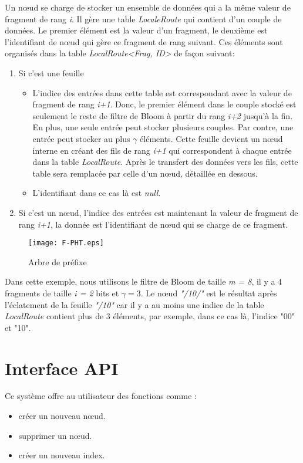 \documentclass[a4paper,11pt]{report}
\begin{document}
	Un nœud se charge de stocker un ensemble de données qui a la même valeur de fragment de rang \textit{i}. Il gère une table \textit{LocaleRoute} qui contient d'un couple de données. Le premier élément est la valeur d'un fragment, le deuxième est l'identifiant de nœud qui gère ce fragment de rang suivant. Ces éléments sont organisés dans la table \textit{LocalRoute<Frag, ID>} de façon suivant:
	\begin{enumerate}
		\item Si c'est une feuille
			\begin{itemize}
				\item L'indice des entrées dans cette table est correspondant avec la valeur de fragment de rang \textit{i+1}. Donc, le premier élément dans le couple stocké est seulement le reste de filtre de Bloom à partir du rang \textit{i+2} jusqu'à la fin. En plus, une seule entrée peut stocker plusieurs couples. Par contre, une entrée peut stocker au plus $\gamma$ éléments. Cette feuille devient un nœud interne en créant des fils de rang \textit{i+1} qui correspondent à chaque entrée dans la table \textit{LocalRoute}. Après le transfert des données vers les fils, cette table sera remplacée par celle d'un nœud, détaillée en dessous.
				\item L'identifiant dans ce cas là est \textit{null}.
			\end{itemize}
		\item Si c'est un nœud, l'indice des entrées est maintenant la valeur de fragment de rang \textit{i+1}, la donnée est l'identifiant de nœud qui se charge de ce fragment.
	\end{enumerate}	
		
	\begin{figure}[!htbp]
	\centering
	\texttt{[image: F-PHT.eps]}
	\caption{Arbre de préfixe}
	\label{F-PHT}
	\end{figure}	

\newpage	

	Dans cette exemple, nous utilisons le filtre de Bloom de taille \textit{m = 8}, il y a 4 fragments de taille \textit{i = 2} bits et $\gamma = 3$. Le nœud \textit{"/10/"} est le résultat après l'éclatement de la feuille \textit{"/10"} car il y a au moins une indice de la table \textit{LocalRoute} contient plus de 3 éléments, par exemple, dans ce cas là, l'indice "00" et "10".

\section{Interface API}
	Ce système offre au utilisateur des fonctions comme :
	\begin{itemize}
		\item créer un nouveau nœud.
		\item supprimer un nœud.
		\item créer un nouveau index.
	\end{itemize}
	
\end{document}
